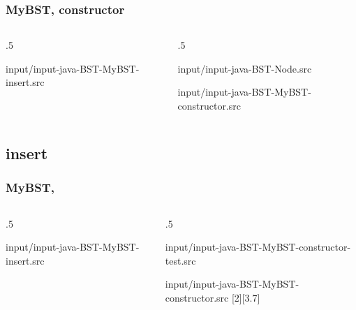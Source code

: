 \documentclass[10pt]{beamer}
\begin{document}
\begin{frame}[t]\frametitle{MyBST, constructor}
	\vspace{-0.3cm}
	\begin{columns}[T] %
	\begin{column}{.5\linewidth} %
		{\tiny 
			
				{input/input-java-BST-MyBST-insert.src}
		} %
	\end{column} %
	\begin{column}{.5\linewidth} %
		{\tiny 
			
				{input/input-java-BST-Node.src}
		} %
		{\tiny 
			
				{input/input-java-BST-MyBST-constructor.src}
		} %
	\end{column} %
	\end{columns} %

\end{frame}




\subsection{insert}
\begin{frame}[t]\frametitle{MyBST, }
	\vspace{-0.3cm}
	\begin{columns}[T] %
	\begin{column}{.5\linewidth} %
		{\tiny 
			
				{input/input-java-BST-MyBST-insert.src}
		} %
	\end{column} %
	\begin{column}{.5\linewidth} %
		{\tiny 
			
				{input/input-java-BST-MyBST-constructor-test.src}
			
				{input/input-java-BST-MyBST-constructor.src}
		} %
	\end{column} %
	\end{columns} %

\end{frame}
\end{document}
